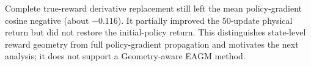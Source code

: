 Complete true-reward derivative replacement still left the mean policy-gradient cosine negative (about $-0.116$). It partially improved the 50-update physical return but did not restore the initial-policy return. This distinguishes state-level reward geometry from full policy-gradient propagation and motivates the next analysis; it does not support a Geometry-aware EAGM method.

